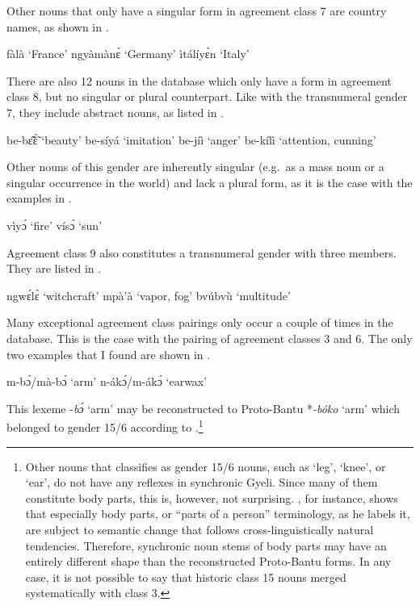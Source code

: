 \noindent Other nouns that only have a singular form in agreement class 7 are country names, as shown in .

\ea\label{7/0b}
\ea fàlà `France'
\ex ngyàmànɛ̀ `Germany'
\ex ìtálíyɛ̀n `Italy'
\z
\z



There are also 12 nouns in the database which only have a form in agreement class 8, but no singular or plural counterpart. Like with the transnumeral gender 7, they include abstract nouns, as listed in .


\ea\label{0/8a}
\ea be-bɛ̃̂ɛ̃̀ `beauty'
\ex be-síyá `imitation'
\ex be-jíì `anger'
\ex be-kílì  `attention, cunning'
\z
\z

\noindent Other nouns of this gender are inherently singular (e.g.\ as a mass noun or a singular occurrence in the world) and lack a plural form, as it is the case with the examples in .

\ea\label{0/8b}
\ea vìyɔ́ `fire'
\ex vísɔ́ `sun'
\z
\z



Agreement class 9 also constitutes a transnumeral gender with three members. They are listed in .


\ea\label{0/9}
\ea ngwɛ́lɛ̀ `witchcraft'
\ex mpà'à `vapor, fog'
\ex bvúbvù `multitude'
\z
\z

Many exceptional agreement class pairings only occur a couple of times in the database. This is the case with the pairing of agreement classes 3 and 6. The only two examples that I found are shown in .


\ea\label{3/6}
\ea m-bɔ́/mà-bɔ́ `arm'
\ex n-ákɔ́/m-ákɔ́ `earwax'
\z
\z


\noindent This lexeme -{\itshape bɔ́} `arm' may be reconstructed to Proto-Bantu *{\itshape -bóko} `arm' which belonged to gender 15/6 according to \citet[102]{meeussen67}.\footnote{Other nouns that \citet[102]{meeussen67} classifies as gender 15/6 nouns, such as `leg', `knee',  or `ear', do not have any reflexes in synchronic Gyeli. Since many of them constitute body parts, this is, however, not surprising. \citet{wilkins96}, for instance, shows that especially body parts, or ``parts of a person'' terminology, as he labels it, are subject to semantic change that follows cross-linguistically natural tendencies. Therefore, synchronic noun stems of body parts may have an entirely different shape than the reconstructed Proto-Bantu forms. In any case, it is not possible to say that historic class 15 nouns merged systematically with class 3.}


